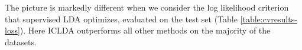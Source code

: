 \documentclass[10pt, a4paper, conference]{IEEEtran}
\begin{document}
The picture is markedly different when we consider the log likelihood criterion that supervised LDA optimizes, evaluated on the test set (Table \ref{table:cvresults-loss}). Here ICLDA outperforms all other methods on the majority of the datasets. 

%
%



%
%
\end{document}
